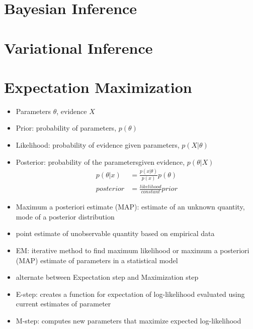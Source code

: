 \documentclass[../main.tex]{subfiles}
\begin{document}
\section{Bayesian Inference}

\section{Variational Inference}

\section{Expectation Maximization}
  \begin{itemize}
    \item Parameters $\theta$, evidence $X$
    \item Prior: probability of parameters, $p(\theta)$
    \item Likelihood: probability of evidence given parameters, $p(X | \theta)$
    \item Posterior: probability of the parametersgiven evidence, $p(\theta | X)$
    \begin{align*}
      p(\theta|x) &= \frac{p(x|\theta)}{p(x)}p(\theta) \\
      posterior &= \frac{likelihood}{constant}{prior}
    \end{align*}
    \item Maximum a posteriori estimate (MAP): estimate of an unknown quantity, mode of a posterior distribution
    \item point estimate of unobservable quantity based on empirical data

    \item EM: iterative method to find maximum likelihood or maximum a posteriori (MAP) estimate of parameters in a statistical model

    \item alternate between Expectation step and Maximization step
    \item E-step: creates a function for expectation of log-likelihood evaluated using current estimates of parameter
    \item M-step: computes new parameters that maximize expected log-likelihood
  \end{itemize}
\end{document}
